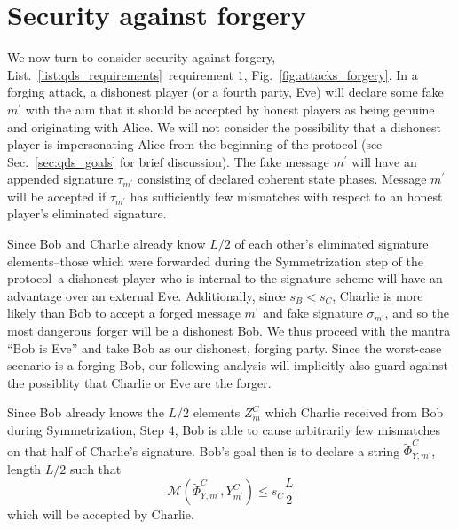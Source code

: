 \section{Security against forgery}\label{sec:qds_security_forgery}
We now turn to consider security against forgery, List.~\ref{list:qds_requirements}~requirement $1$, Fig.~\ref{fig:attacks_forgery}. In a forging attack, a dishonest player (or a fourth party, Eve) will declare some fake $m^\prime$ with the aim that it should be accepted by honest players as being genuine and originating with Alice. %
We will not consider the possibility that a dishonest player is impersonating Alice from the beginning of the protocol (see Sec.~\ref{sec:qds_goals} for brief discussion). The fake message $m^\prime$ will have an appended signature $\tau_{m^\prime}$ consisting of declared coherent state phases. Message $m^\prime$ will be accepted if $\tau_{m^\prime}$ has sufficiently few mismatches with respect to an honest player's eliminated signature. 


Since Bob and Charlie already know $L/2$ of each other's eliminated signature elements--those which were forwarded during the Symmetrization step of the protocol--a dishonest player who is internal to the signature scheme will have an advantage over an external Eve. Additionally, since $s_B < s_C$, Charlie is more likely than Bob to accept a forged message $m^\prime$ and fake signature $\sigma_{m^\prime}$, and so the most dangerous forger will be a dishonest Bob. We thus proceed with the mantra ``Bob is Eve'' and take Bob as our dishonest, forging party. Since the worst-case scenario is a forging Bob, our following analysis will implicitly also guard against the possiblity that Charlie or Eve are the forger.

Since Bob already knows the $L/2$ elements $Z_{m}^C$ which Charlie received from Bob during Symmetrization, Step $4$, Bob is able to cause arbitrarily few mismatches on that half of Charlie's signature. Bob's goal then is to declare a string $\tilde{\Phi}^C_{Y, m^\prime}$, length $L/2$ such that 
\begin{equation}\label{eqn:forging_condition}
\mathcal{M}\left(\tilde{\Phi}^C_{Y, m^\prime}, Y_{m^\prime}^C\right) \le s_C \frac{L}{2}
\end{equation}
which will be accepted by Charlie.

